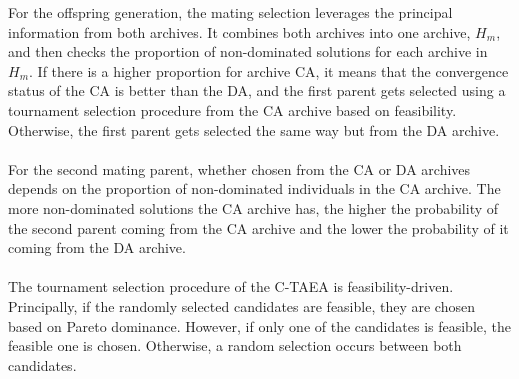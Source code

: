 \documentclass[mscthesis, 11pt]{usiinfthesis}
\theoremstyle{newdefinition}
\begin{document}
For the offspring generation, the mating selection leverages the principal information from both archives. It combines both archives into one archive, $H_m$, and then checks the proportion of non-dominated solutions for each archive in $H_m$. If there is a higher proportion for archive CA, it means that the convergence status of the CA is better than the DA, and the first parent gets selected using a tournament selection procedure from the CA archive based on feasibility. Otherwise, the first parent gets selected the same way but from the DA archive. \cite[~p.~307-308]{li_two-archive_2019}
\\\\
For the second mating parent, whether chosen from the CA or DA archives depends on the proportion of non-dominated individuals in the CA archive. The more non-dominated solutions the CA archive has, the higher the probability of the second parent coming from the CA archive and the lower the probability of it coming from the DA archive. \cite[~p.~308]{li_two-archive_2019}
\\\\
The tournament selection procedure of the C-TAEA is feasibility-driven. Principally, if the randomly selected candidates are feasible, they are chosen based on Pareto dominance. However, if only one of the candidates is feasible, the feasible one is chosen. Otherwise, a random selection occurs between both candidates. \cite[~p.~308]{li_two-archive_2019}
\end{document}
